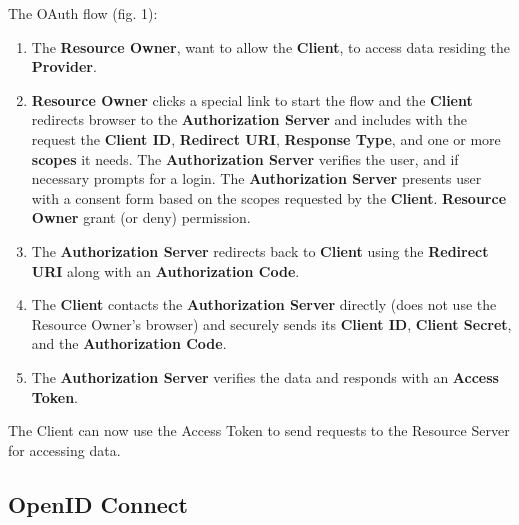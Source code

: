 	The OAuth flow (fig. 1):
	\begin{enumerate}
		\item The \textbf{Resource Owner}, want to allow the \textbf{Client}, to access data residing the \textbf{Provider}.
		
		\item \textbf{Resource Owner} clicks a special link to start the flow and the \textbf{Client }redirects browser to the \textbf{Authorization Server} and includes with the request the \textbf{Client ID}, \textbf{Redirect URI}, \textbf{Response Type}, and one or more \textbf{scopes} it needs. The \textbf{Authorization Server} verifies the user, and if necessary prompts for a login. The \textbf{Authorization Server} presents user with a consent form based on the scopes requested by the \textbf{Client}. \textbf{Resource Owner} grant (or deny) permission.
		
		\item The \textbf{Authorization Server} redirects back to \textbf{Client} using the \textbf{Redirect URI} along with an \textbf{Authorization Code}.
		
		\item The \textbf{Client} contacts the \textbf{Authorization Server} directly (does not use the Resource Owner’s browser) and securely sends its \textbf{Client ID}, \textbf{Client Secret}, and the \textbf{Authorization Code}.
		
		\item The \textbf{Authorization Server} verifies the data and responds with an \textbf{Access Token}.
		
	\end{enumerate}
The Client can now use the Access Token to send requests to the Resource Server for accessing data.



\subsection{OpenID Connect}

